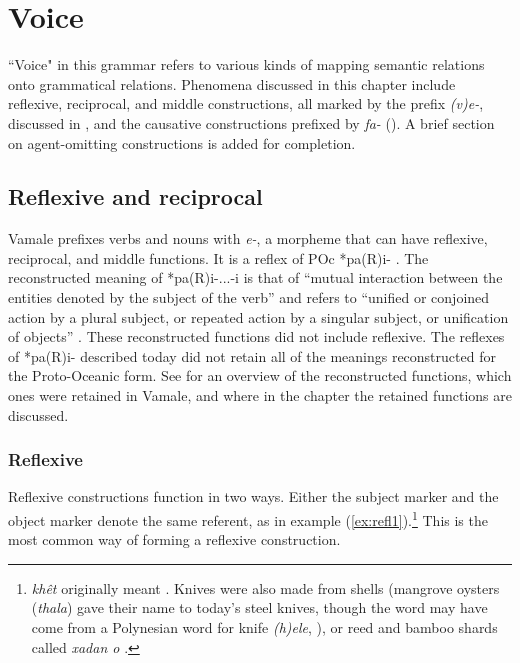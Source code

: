 \chapter{Voice} 
\label{ChapterVoice} 

``Voice" in this grammar refers to various kinds of mapping semantic relations onto grammatical relations. Phenomena discussed in this chapter include reflexive, reciprocal, and middle constructions, all marked by the prefix \textit{(v)e-}, discussed in , and the causative constructions prefixed by \textit{fa-} (). A brief section on agent-omitting constructions is added for completion.


\section{Reflexive and reciprocal}
\label{sec:refl}

Vamale prefixes verbs and nouns with \textit{e-}, a morpheme that can have reflexive, reciprocal, and middle functions. It is a reflex of POc *pa(R)i- \parencite[151--152]{pawley_problems_1973}. The reconstructed meaning of *pa(R)i-...-i is that of ``mutual interaction between the entities denoted by the subject of the verb” and refers to ``unified or conjoined action by a plural subject, or repeated action by a singular subject, or unification of objects” \parencite[151--152]{pawley_problems_1973}. These reconstructed functions did not include reflexive. The reflexes of *pa(R)i- described today did not retain all of the meanings reconstructed for the Proto-Oceanic form. See  for an overview of the reconstructed functions, which ones were retained in Vamale, and where in the chapter the retained functions are discussed. 

\subsection{Reflexive}
Reflexive constructions function in two ways. Either the subject marker and the object marker denote the same referent, as in example (\ref{ex:refl1}).\footnote{\textit{khêt} originally meant . Knives were also made from shells (mangrove oysters (\textit{thala}) gave their name to today's steel knives, though the word may have come from a Polynesian word for knife \textit{(h)ele}, \citealt{hollyman_polynesian_1959}), or reed and bamboo shards called \textit{xadan o} .} This is the most common way of forming a reflexive construction.

